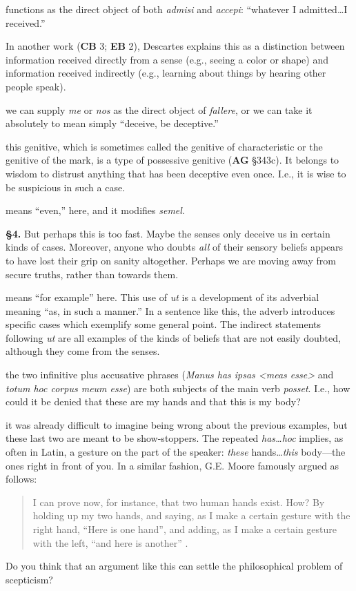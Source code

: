  functions as the direct object of both \textit{admisi} and \textit{accepi}: ``whatever I admitted\dots I received.''

 In another work (\textbf{CB} 3; \textbf{EB} 2), Descartes explains this as a distinction between information received directly from a sense (e.g., seeing a color or shape) and information received indirectly (e.g., learning about things by hearing other people speak).

 we can supply \textit{me} or \textit{nos} as the direct object of \textit{fallere}, or we can take it absolutely to mean simply ``deceive, be deceptive.''

 this genitive, which is sometimes called the genitive of characteristic or the genitive of the mark, is a type of possessive genitive (\textbf{AG} §343c). It belongs to wisdom to distrust anything that has been deceptive even once. I.e., it is wise to be suspicious in such a case.

 means ``even,'' here, and it modifies \textit{semel}.

\textbf{§4.} But perhaps this is too fast. Maybe the senses only deceive us in certain kinds of cases. Moreover, anyone who doubts \textit{all} of their sensory beliefs appears to have lost their grip on sanity altogether. Perhaps we are moving away from secure truths, rather than towards them. 

 means ``for example'' here. This use of \textit{ut} is a development of its adverbial meaning ``as, in such a manner.'' In a sentence like this, the adverb introduces specific cases which exemplify some general point. The indirect statements following \textit{ut} are all examples of the kinds of beliefs that are not easily doubted, although they come from the senses.

 the two infinitive plus accusative phrases (\textit{Manus has ipsas <meas esse>} and \textit{totum hoc corpus meum esse}) are both subjects of the main verb \textit{posset}. I.e., how could it be denied that these are my hands and that this is my body?

 it was already difficult to imagine being wrong about the previous examples, but these last two are meant to be show-stoppers. The repeated \textit{has\dots hoc} implies, as often in Latin, a gesture on the part of the speaker: \textit{these} hands\dots \textit{this} body---the ones right in front of you. In a similar fashion, G.E. Moore famously argued as follows:
\begin{quote}
    I can prove now, for instance, that two human hands exist. How? By holding up my two hands, and saying, as I make a certain gesture with the right hand, ``Here is one hand'', and adding, as I make a certain gesture with the left, ``and here is another'' \parencite[165--166]{baldwin1993}.
\end{quote}
Do you think that an argument like this can settle the philosophical problem of scepticism?

